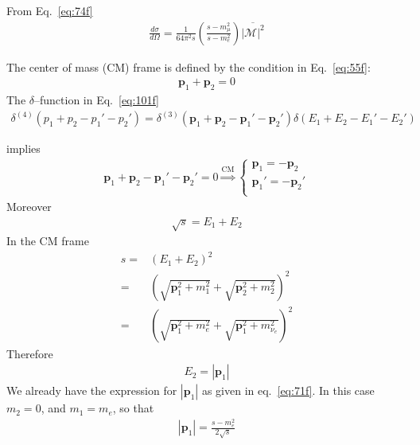 From Eq.~\eqref{eq:74f}
\begin{align}
  \label{eq:103f}
  \frac{d\sigma}{d\Omega}=\frac{1}{64\pi^2s}\left(\frac{s-m_\mu^2}{s-m_e^2}\right)\overline{|\mathcal{M}|^2}
\end{align}

The center of mass (CM) frame is defined by the condition in Eq.~\eqref{eq:55f}:
\begin{align}
  \mathbf{p}_1+\mathbf{p}_2=0
\end{align}
The $\delta$--function in Eq.~\eqref{eq:101f}
\begin{align}
  \delta^{(4)}(p_1+p_2-p_1'-p_2')=\delta^{(3)}(\mathbf{p}_1+\mathbf{p}_2-\mathbf{p}_1'-\mathbf{p}_2')
\delta(E_1+E_2-E_1'-E_2')
\end{align}

implies
\begin{align}
  \label{eq:157f}
  \mathbf{p}_1+\mathbf{p}_2-\mathbf{p}_1'-\mathbf{p}_2'=0 \overset{\text{CM}}{\Rightarrow}
  \begin{cases}
    \mathbf{p}_1=-\mathbf{p}_2\\
    \mathbf{p}_1'=-\mathbf{p}_2'\\
  \end{cases}
\end{align}
Moreover
\begin{align}
  \sqrt{s}=E_1+E_2
\end{align}
In the CM frame
\begin{align}
\label{eq:104f}
s=&\left(E_1+E_2\right)^2\nonumber\\
=&\left(\sqrt{\mathbf{p}_1^2+m_1^2}+\sqrt{\mathbf{p}_2^2+m_2^2}\right)^2\nonumber\\
=&\left(\sqrt{\mathbf{p}_1^2+m_e^2}+\sqrt{\mathbf{p}_1^2+m_{\nu_e}^2}\right)^2
\end{align}
Therefore
\begin{align}
  \label{eq:105f}
  E_2=|\mathbf{p}_1|
\end{align}
We already have the expression for $|\mathbf{p}_1|$ as given in eq.~\eqref{eq:71f}. In this case $m_2=0$, and $m_1=m_e$, so that
\begin{align}
  \label{eq:158f}
  |\mathbf{p}_1|=\frac{s-m_e^2}{2\sqrt{s}}
\end{align}

